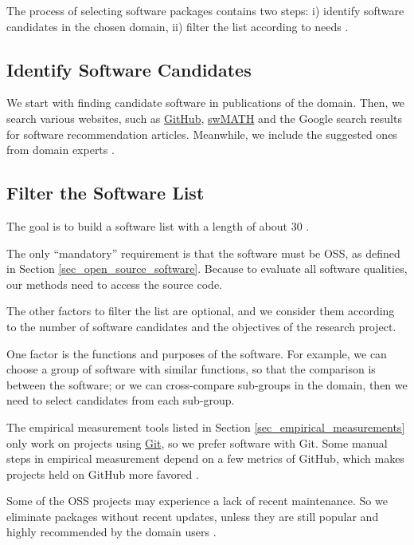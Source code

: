 The process of selecting software packages contains two steps: i) identify software candidates in the chosen domain, ii) filter the list according to needs \cite{SmithEtAl2021}.

\subsection{Identify Software Candidates}
\label{sec_identify_software_candidates}
We start with finding candidate software in publications of the domain. Then, we search various websites, such as \hyperlink{https://github.com/}{GitHub}, \hyperlink{https://swmath.org/}{swMATH} and the Google search results for software recommendation articles. Meanwhile, we include the suggested ones from domain experts \cite{SmithEtAl2021}.

\subsection{Filter the Software List}
\label{sec_filter_software_list}
The goal is to build a software list with a length of about 30 \cite{SmithEtAl2021}.

The only ``mandatory'' requirement is that the software must be OSS, as defined in Section \ref{sec_open_source_software}. Because to evaluate all software qualities, our methods need to access the source code.

The other factors to filter the list are optional, and we consider them according to the number of software candidates and the objectives of the research project.

One factor is the functions and purposes of the software. For example, we can choose a group of software with similar functions, so that the comparison is between the software; or we can cross-compare sub-groups in the domain, then we need to select candidates from each sub-group.

The empirical measurement tools listed in Section \ref{sec_empirical_measurements} only work on projects using \hyperlink{https://git-scm.com/}{Git}, so we prefer software with Git. Some manual steps in empirical measurement depend on a few metrics of GitHub, which makes projects held on GitHub more favored \cite{SmithEtAl2021}.

Some of the OSS projects may experience a lack of recent maintenance. So we eliminate packages without recent updates, unless they are still popular and highly recommended by the domain users \cite{SmithEtAl2021}.

